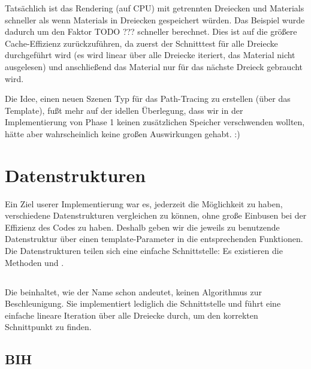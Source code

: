 Tatsächlich ist das Rendering (auf CPU) mit getrennten Dreiecken und Materials schneller als wenn Materials in Dreiecken gespeichert würden. Das  Beispiel wurde dadurch um den Faktor TODO ??? schneller berechnet. Dies ist auf die größere Cache-Effizienz zurückzuführen, da zuerst der Schnitttest für alle Dreiecke durchgeführt wird (es wird linear über alle Dreiecke iteriert, das Material nicht ausgelesen) und anschließend das Material nur für das nächste Dreieck gebraucht wird.

Die Idee, einen neuen Szenen Typ für das Path-Tracing zu erstellen (über das  Template), fußt mehr auf der idellen Überlegung, dass wir in der Implementierung von Phase 1 keinen zusätzlichen Speicher verschwenden wollten, hätte aber wahrscheinlich keine großen Auswirkungen gehabt. :)


\section{Datenstrukturen}

Ein Ziel userer Implementierung war es, jederzeit die Möglichkeit zu haben, verschiedene Datenstrukturen vergleichen zu können, ohne große Einbusen bei der Effizienz des Codes zu haben. Deshalb geben wir die jeweils zu benutzende Datenstruktur über einen template-Parameter in die entsprechenden Funktionen. Die Datenstrukturen teilen sich eine einfache Schnittstelle: Es existieren die Methoden  und .

\subsection{}

Die  beinhaltet, wie der Name schon andeutet, keinen Algorithmus zur Beschleunigung. Sie implementiert lediglich die Schnittstelle und führt eine einfache lineare Iteration über alle Dreiecke durch, um den korrekten Schnittpunkt zu finden.

\subsection{BIH}
\label{ssec:bih}

